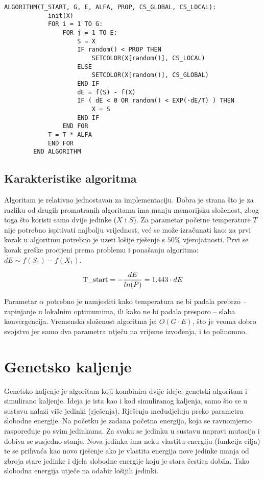 \documentclass[times, utf8, diplomski, numeric]{fer}
\begin{document}
\begin{singlespace}
	\begin{lstlisting}[caption=Pseudok\^{o}d simuliranog kaljenja]
		ALGORITHM(T_START, G, E, ALFA, PROP, CS_GLOBAL, CS_LOCAL):
			init(X)
			FOR i = 1 TO G:
				FOR j = 1 TO E:
					S = X
					IF random() < PROP THEN
						SETCOLOR(X[random()], CS_LOCAL)
					ELSE
						SETCOLOR(X[random()], CS_GLOBAL)
					END IF
					dE = f(S) - f(X)
					IF ( dE < 0 OR random() < EXP(-dE/T) ) THEN
						X = S
					END IF
				END FOR
			T = T * ALFA
			END FOR
		END ALGORITHM
	\end{lstlisting}
\end{singlespace}

\subsection{Karakteristike algoritma}

Algoritam je relativno jednostavan za implementaciju. Dobra je strana što je za razliku od drugih promatranih algoritama ima manju memorijsku složenost, zbog toga što koristi samo dvije jedinke ($X$ i $S$). Za parametar početne temperature $T$ nije potrebno ispitivati najbolju vrijednost, već se može izračunati kao: za prvi korak u algoritmu potrebno je uzeti lošije rješenje s $50\%$ vjerojatnosti. Prvi se korak greške procijeni prema problemu i ponašanju algoritma: $\tilde{dE}\sim f(S_1)-f(X_1)$.  

\begin{equation}
\textup{T\_start} = -\frac{dE}{ln(P)} = 1.443 \cdot dE
\end{equation}  

Parametar $\alpha$ potrebno je namjestiti kako temperatura ne bi padala prebrzo -- zapinjanje u lokalnim optimumima, ili kako ne bi padala presporo -- slaba konvergencija. Vremenska složenost algoritma je: $O(G\cdot E)$, što je veoma dobro svojstvo jer samo dva parametra utječu na vrijeme izvođenja, i to polinomno. 

\section{Genetsko kaljenje}

Genetsko kaljenje \cite{lit18} je algoritam koji kombinira dvije ideje: genetski algoritam i simulirano kaljenje. Ideja je ista kao i kod simuliranog kaljenja, samo što se u sustavu nalazi više jedinki (rješenja). Rješenja međudjeluju preko parametra slobodne energije. Na početku je zadana početna energija, koja se ravnomjerno raspoređuje po svim jedinkama. Za svaku se jedinku u sustavu napravi mutacija i dobiva se susjedno stanje. Nova jedinka ima neku vlastitu energiju (funkcija cilja) te se prihvaća kao novo rješenje ako je vlastita energija nove jedinke manja od zbroja stare jedinke i djela slobodne energije koju je stara čestica dobila. Tako slobodna energija utječe na odabir lošijih jedinki.
\end{document}
